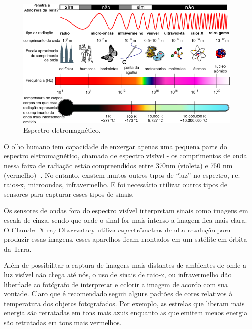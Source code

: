 \documentclass[
	article,			%
	12pt,				%
	oneside,			%
	a4paper,			%
	english,			%
	brazil,				%
	sumario=tradicional
	]{abntex2}
\begin{document}
\begin{figure}[h]
	\includegraphics[width=\linewidth]{img/espectro.png}
	\caption{Espectro eletromagnético.}
	\label{fig:esel}
	\centering
\end{figure}

O olho humano tem capacidade de enxergar apenas uma pequena parte do espectro
eletromagnético, chamada de espectro visível - os comprimentos de onda nessa
faixa de radiação estão compreendidos entre 370nm (violeta) e 750 nm (vermelho)
-. No entanto, existem muitos outros tipos de ``luz'' no espectro, i.e. raios-x,
microondas, infravermelho. E foi necessário utilizar outros tipos de sensores
para capturar esses tipos de sinais.

Os sensores de ondas fora do espectro visível interpretam sinais como imagens em
escala de cinza, sendo que onde o sinal for mais intenso a imagem fica mais
clara. O Chandra X-ray Observatory utiliza espectrômetros de alta resolução para
produzir essas imagens, esses aparelhos ficam montados em um satélite em órbita
da Terra. \cite{scienceinstruments}

Além de possibilitar a captura de imagens mais distantes de ambientes de onde a
luz visível não chega até nós, o uso de sinais de raio-x, ou infravermelho dão
liberdade ao fotógrafo de interpretar e colorir a imagem de acordo com sua
vontade. Claro que é recomendado seguir alguns padrões de cores relativos à
temperatura dos objetos fotografados. Por exemplo, as estrelas que liberam mais
energia são retratadas em tons mais azuis enquanto as que emitem menos energia
são retratadas em tons mais vermelhos. \cite{temperatura}
\end{document}
